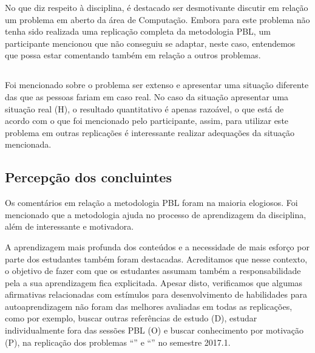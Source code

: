 No que diz respeito à disciplina, é destacado ser desmotivante
discutir em relação um problema em aberto da área de Computação.
Embora para este problema não tenha sido realizada uma replicação
completa da metodologia \ac{PBL}, um participante mencionou que não
conseguiu se adaptar, neste caso, entendemos que possa estar
comentando também em relação a outros problemas.

\subsection{\ProblemaG}

Foi mencionado sobre o problema ser extenso e
apresentar uma situação diferente das que as pessoas fariam em caso
real.
No caso da situação apresentar uma situação real (H), o resultado
quantitativo é apenas razoável, o que está de acordo
com o que foi mencionado pelo participante, assim, para utilizar
este problema em outras replicações é interessante realizar adequações
da situação mencionada.

\subsection{Percepção dos concluintes}

Os comentários em relação a metodologia \ac{PBL} foram na maioria elogiosos.
Foi mencionado que a metodologia ajuda no processo de aprendizagem da
disciplina, além de interessante e motivadora.

A aprendizagem mais profunda dos conteúdos e a necessidade de mais
esforço por parte dos estudantes também foram destacadas.
Acreditamos que nesse contexto, o objetivo de fazer com que
os estudantes assumam também a responsabilidade pela a
sua aprendizagem fica explicitada.
Apesar disto, verificamos que algumas afirmativas relacionadas
com estímulos para desenvolvimento de habilidades para autoaprendizagem
não foram das melhores avaliadas em todas as replicações,
como por exemplo, buscar outras referências de estudo (D),
estudar individualmente fora das sessões \ac{PBL} (O) e buscar
conhecimento por motivação (P), na replicação dos
problemas ``\ProblemaG'' e ``\ProblemaB'' no semestre 2017.1.

